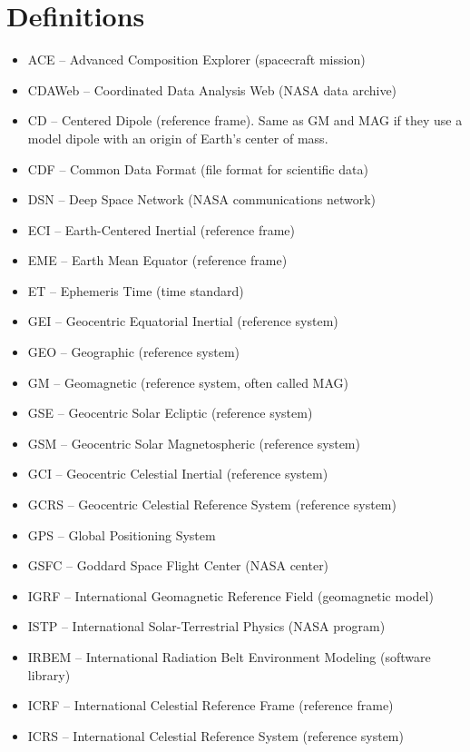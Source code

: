 \documentclass[draft]{agujournal2019}
\begin{document}
\section{Definitions}
\label{sect:glossary}

\begin{itemize}
\item ACE -- Advanced Composition Explorer (spacecraft mission)
\item CDAWeb -- Coordinated Data Analysis Web (NASA data archive)
\item CD -- Centered Dipole (reference frame). Same as GM and MAG if they use a model dipole with an origin of Earth's center of mass.
\item CDF -- Common Data Format (file format for scientific data)
\item DSN -- Deep Space Network (NASA communications network)
\item ECI -- Earth-Centered Inertial (reference frame)
\item EME -- Earth Mean Equator (reference frame)
\item ET -- Ephemeris Time (time standard)
\item GEI -- Geocentric Equatorial Inertial (reference system)
\item GEO -- Geographic (reference system)
\item GM -- Geomagnetic (reference system, often called MAG)
\item GSE -- Geocentric Solar Ecliptic (reference system)
\item GSM -- Geocentric Solar Magnetospheric (reference system)
\item GCI -- Geocentric Celestial Inertial (reference system)
\item GCRS -- Geocentric Celestial Reference System (reference system)
\item GPS -- Global Positioning System
\item GSFC -- Goddard Space Flight Center (NASA center)
\item IGRF -- International Geomagnetic Reference Field (geomagnetic model)
\item ISTP -- International Solar-Terrestrial Physics (NASA program)
\item IRBEM -- International Radiation Belt Environment Modeling (software library)
\item ICRF -- International Celestial Reference Frame (reference frame)
\item ICRS -- International Celestial Reference System (reference system)

\end{itemize}
\end{document}
